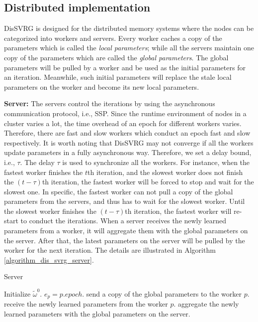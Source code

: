 \documentclass[preprint,review,11pt,a4paper]{elsarticle}
\begin{document}
\subsection{Distributed implementation}
DisSVRG is designed for the distributed memory systems where the nodes can be categorized into workers and servers. Every worker caches a copy of the parameters which is called the \emph{local parameters}; while all the servers maintain one copy of the parameters which are called the \emph{global parameters}. The global parameters will be pulled by a worker and be used as the initial parameters for an iteration. Meanwhile, such initial parameters will replace the stale local parameters on the worker and become its new local parameters.

\textbf{Server:}    The servers control the iterations by using the asynchronous communication protocol, i.e., SSP.  Since the runtime environment of nodes in a cluster varies a lot, the  time overhead of an epoch for different workers  varies. Therefore, there are fast and slow workers which conduct an epoch fast and slow respectively.   It is worth noting that DisSVRG may not converge if all the workers update parameters in a fully asynchronous way. Therefore, we set a delay bound, i.e., $\tau$. The delay $\tau$ is used to synchronize all the workers. For instance, when the fastest worker finishes the $t$th iteration, and the slowest worker does not finish the $(t-\tau)$th iteration, the fastest worker will be forced to stop and wait for the slowest one. In specific, the fastest worker can not  pull a copy of the global parameters from the servers, and thus has to wait for the slowest worker. Until the slowest worker finishes the $(t-\tau)$th iteration, the fastest worker will re-start to conduct the iterations. When a server receives the newly learned parameters from a worker, it will aggregate them with the global parameters on the server. After that, the latest parameters on the server will be pulled by the worker for the next iteration.
The details are illustrated in Algorithm \ref{algorithm_dis_svrg_server}.

\begin{algorithm}[t]
    \caption{Server}
    \label{algorithm_dis_svrg_server}
    \begin{algorithmic}[1]
        \State Initialize $\tilde{\omega}^0$.
               \State $e_p=p.epoch$.
                    \State send a copy of the global parameters to the worker $p$.
                \EndIf
            \EndIf
                \State receive the newly learned parameters from the worker $p$.
                \State aggregate the newly learned parameters with the global parameters on the server.
            \EndIf
        \EndWhile
    \end{algorithmic}
\end{algorithm}
\end{document}

